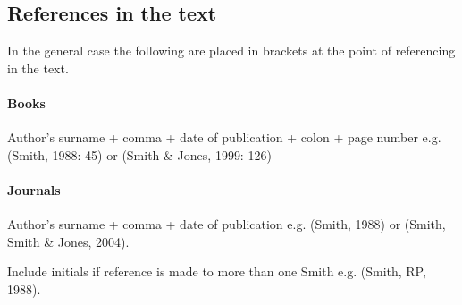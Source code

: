 \documentclass[a5paper, 10pt]{article}
\begin{document}
\subsection{References in the text}

In the general case the following are placed in brackets at the point
of referencing in the text.

\paragraph{Books} Author's surname + comma + date of publication + colon +
page number e.g. (Smith, 1988: 45) or (Smith \& Jones, 1999: 126)

\paragraph{Journals} Author's surname + comma + date of publication e.g.
(Smith, 1988) or (Smith, Smith \& Jones, 2004).

Include initials if reference is made to more than one Smith e.g.
(Smith, RP, 1988).
\end{document}
